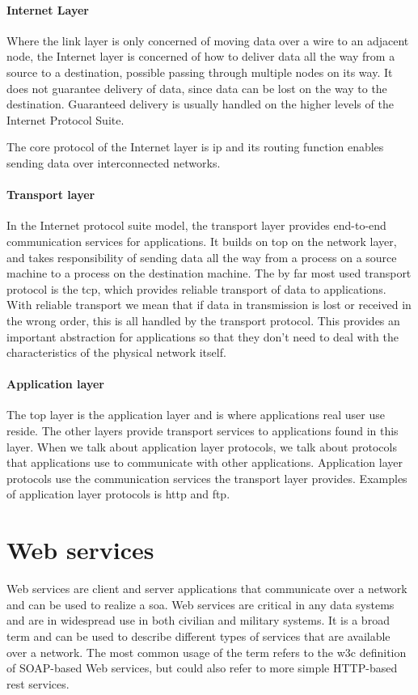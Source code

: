 \paragraph{Internet Layer}

 Where the link layer is only concerned of moving data over a wire to an
 adjacent node, the Internet layer is concerned of how to deliver data all the
 way from a source to a destination, possible passing through multiple nodes on
 its way. It does not guarantee delivery of data, since data can be lost on the
 way to the destination. Guaranteed delivery is usually handled on the higher
 levels of the Internet Protocol Suite.

 The core protocol of the Internet layer is \gls{ip} and its routing function
 enables sending data over interconnected networks.

\paragraph{Transport layer}

In the Internet protocol suite model, the transport layer provides end-to-end
communication services for applications. It builds on top on the network layer,
and takes responsibility of sending data all the way from a process on a source
machine to a process on the destination machine. The by far most used transport
protocol is the \gls{tcp}, which provides reliable transport of data to
applications. With reliable transport we mean that if data in transmission is
lost or received in the wrong order, this is all handled by the transport
protocol. This provides an important abstraction for applications so that they
don't need to deal with the characteristics of the physical network itself.

\paragraph{Application layer}

The top layer is the application layer and is where applications real user use
reside. The other layers provide transport services to applications found in
this layer. When we talk about application layer protocols, we talk about
protocols that applications use to communicate with other applications.
Application layer protocols use the communication services the transport layer
provides.  Examples of application layer protocols is \gls{http} and \gls{ftp}.

\section{Web services}
\label{web-services}
Web services are client and server applications that communicate over a network
and can be used to realize a \gls{soa}. Web services are critical in any data
systems and are in widespread use in both civilian and military systems. It is a
broad term and can be used to describe different types of services that are
available over a network. The most common usage of the term refers to the
\gls{w3c} definition of SOAP-based Web services, but could also refer to more
simple HTTP-based \gls{rest} services.

